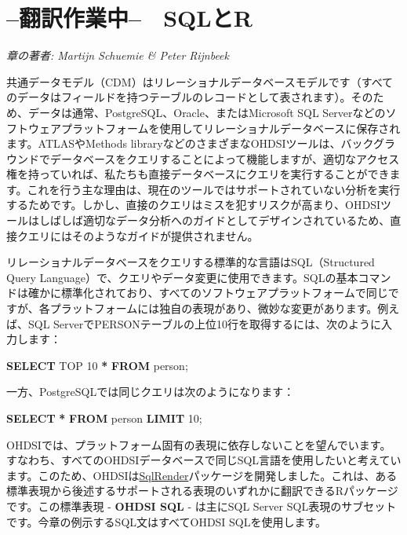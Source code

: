 \documentclass[
  11pt]{book}
\newenvironment{Shaded}{\begin{snugshade}}{\end{snugshade}}
\newcommand{\DecValTok}[1]{\textcolor[rgb]{0.00,0.00,0.81}{#1}}
\newcommand{\KeywordTok}[1]{\textcolor[rgb]{0.13,0.29,0.53}{\textbf{#1}}}
\newcommand{\NormalTok}[1]{#1}
\newcommand{\OperatorTok}[1]{\textcolor[rgb]{0.81,0.36,0.00}{\textbf{#1}}}
\theoremstyle{definition}
\theoremstyle{definition}
\theoremstyle{definition}
\theoremstyle{definition}
\theoremstyle{remark}
\begin{document}
\chapter{--翻訳作業中--　SQLとR}\label{SqlAndR}

\emph{章の著者: Martijn Schuemie \& Peter Rijnbeek}

共通データモデル（CDM）はリレーショナルデータベースモデルです（すべてのデータはフィールドを持つテーブルのレコードとして表されます）。そのため、データは通常、PostgreSQL、Oracle、またはMicrosoft SQL Serverなどのソフトウェアプラットフォームを使用してリレーショナルデータベースに保存されます。ATLASやMethods libraryなどのさまざまなOHDSIツールは、バックグラウンドでデータベースをクエリすることによって機能しますが、適切なアクセス権を持っていれば、私たちも直接データベースにクエリを実行することができます。これを行う主な理由は、現在のツールではサポートされていない分析を実行するためです。しかし、直接のクエリはミスを犯すリスクが高まり、OHDSIツールはしばしば適切なデータ分析へのガイドとしてデザインされているため、直接クエリにはそのようなガイドが提供されません。

リレーショナルデータベースをクエリする標準的な言語はSQL（Structured Query Language）で、クエリやデータ変更に使用できます。SQLの基本コマンドは確かに標準化されており、すべてのソフトウェアプラットフォームで同じですが、各プラットフォームには独自の表現があり、微妙な変更があります。例えば、SQL ServerでPERSONテーブルの上位10行を取得するには、次のように入力します：  

\begin{Shaded}
\begin{Highlighting}[]
\KeywordTok{SELECT}\NormalTok{ TOP }\DecValTok{10} \OperatorTok{*} \KeywordTok{FROM}\NormalTok{ person;}
\end{Highlighting}
\end{Shaded}

一方、PostgreSQLでは同じクエリは次のようになります：

\begin{Shaded}
\begin{Highlighting}[]
\KeywordTok{SELECT} \OperatorTok{*} \KeywordTok{FROM}\NormalTok{ person }\KeywordTok{LIMIT} \DecValTok{10}\NormalTok{;}
\end{Highlighting}
\end{Shaded}

OHDSIでは、プラットフォーム固有の表現に依存しないことを望んでいます。すなわち、すべてのOHDSIデータベースで同じSQL言語を使用したいと考えています。このため、OHDSIは\href{https://ohdsi.github.io/SqlRender/}{SqlRender}パッケージを開発しました。これは、ある標準表現から後述するサポートされる表現のいずれかに翻訳できるRパッケージです。この標準表現 - \textbf{OHDSI SQL} - は主にSQL Server SQL表現のサブセットです。今章の例示するSQL文はすべてOHDSI SQLを使用します。    
\end{document}
